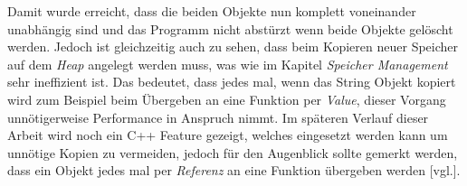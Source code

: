 Damit wurde erreicht, dass die beiden Objekte nun komplett voneinander unabhängig sind und das Programm nicht abstürzt wenn beide Objekte gelöscht werden.
\newline
\newline
Jedoch ist gleichzeitig auch zu sehen, dass beim Kopieren neuer Speicher auf dem \emph{Heap} angelegt werden muss, was wie im Kapitel \emph{Speicher Management} sehr ineffizient ist. Das bedeutet, dass jedes mal, wenn das String Objekt kopiert wird zum Beispiel beim Übergeben an eine Funktion per \emph{Value}, dieser Vorgang unnötigerweise Performance in Anspruch nimmt. Im späteren Verlauf dieser Arbeit wird noch ein C++ Feature gezeigt, welches eingesetzt werden kann um unnötige Kopien zu vermeiden, jedoch für den Augenblick sollte gemerkt werden, dass ein Objekt jedes mal per \emph{Referenz} an eine Funktion übergeben werden \cite{ChernoCopy}[vgl.]. 